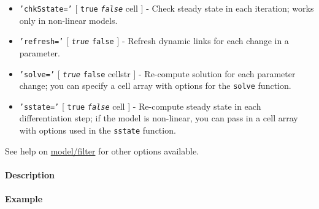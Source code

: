  \begin{itemize}
 \item
   \texttt{'chkSstate='} {[} \texttt{true} \textbar{}
   \emph{\texttt{false}} \textbar{} cell {]} - Check steady state in each
   iteration; works only in non-linear models.
 \item
   \texttt{'refresh='} {[} \emph{\texttt{true}} \textbar{} \texttt{false}
   {]} - Refresh dynamic links for each change in a parameter.
 \item
   \texttt{'solve='} {[} \emph{\texttt{true}} \textbar{} \texttt{false}
   \textbar{} cellstr {]} - Re-compute solution for each parameter
   change; you can specify a cell array with options for the
   \texttt{solve} function.
 \item
   \texttt{'sstate='} {[} \texttt{true} \textbar{} \emph{\texttt{false}}
   \textbar{} cell {]} - Re-compute steady state in each differentiation
   step; if the model is non-linear, you can pass in a cell array with
   options used in the \texttt{sstate} function.
 \end{itemize}
 
 See help on \url{model/filter} for other options available.
 
 \paragraph{Description}
 
 \paragraph{Example}


